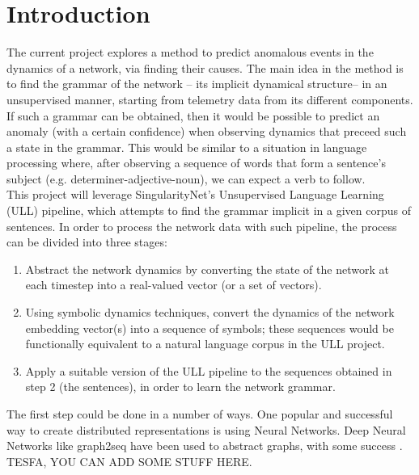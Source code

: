 






\newpage
\section{Introduction}

The current project explores a method to predict anomalous events in the dynamics of a network, via finding their causes.
The main idea in the method is to find the grammar of the network -- its implicit dynamical structure-- in an unsupervised manner, starting from telemetry data from its different components.
If such a grammar can be obtained, then it would be possible to predict an anomaly (with a certain confidence) when observing dynamics that preceed such a state in the grammar.
This would be similar to a situation in language processing where, after observing a sequence of words that form a sentence's subject (e.g. determiner-adjective-noun), we can expect a verb to follow.\\

This project will leverage SingularityNet's Unsupervised Language Learning (ULL) pipeline, which attempts to find the grammar implicit in a given corpus of sentences.
In order to process the network data with such pipeline, the process can be divided into three stages:
\begin{enumerate}
\item Abstract the network dynamics by converting the state of the network at each timestep into a real-valued vector (or a set of vectors).
\item Using symbolic dynamics techniques, convert the dynamics of the network embedding vector(s) into a sequence of symbols; these sequences would be functionally equivalent to a natural language corpus in the ULL project.
\item Apply a suitable version of the ULL pipeline to the sequences obtained in step 2 (the sentences), in order to learn the network grammar.
\end{enumerate}

The first step could be done in a number of ways.
One popular and successful way to create distributed representations is using Neural Networks.
Deep Neural Networks like graph2seq have been used to abstract graphs, with some success 
\cite{venkatakrishnan_graph2seq_2018}.\\
TESFA, YOU CAN ADD SOME STUFF HERE.


